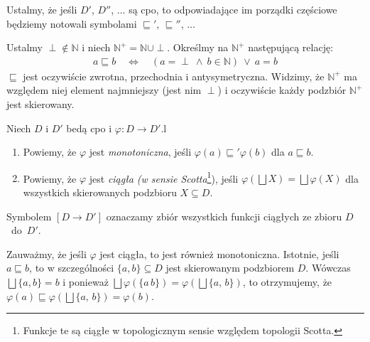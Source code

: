 Ustalmy, że jeśli \(D'\), \(D''\), \(\dots\)  są cpo, to odpowiadające im porządki częściowe będziemy notowali symbolami \(\sqsubseteq'\), \(\sqsubseteq''\), \(\dots\)

\begin{przyklad}\label{ex:scott_d0}
  Ustalmy \(\perp\not\in \mathbb{N}\) i niech \(\mathbb{N}^{+}=\mathbb{N}\cup{\perp}\). Określmy na \(\mathbb{N}^+\) następującą relację:
  \begin{align*}
    a \sqsubseteq b \quad \Leftrightarrow\quad (a=\perp\ \land\ b\in \mathbb{N})\ \lor\ a = b
  \end{align*}
  \(\sqsubseteq\) jest oczywiście zwrotna, przechodnia i antysymetryczna. Widzimy, że \(\mathbb{N}^{+}\) ma względem niej element najmniejszy (jest nim  \(\perp\)) i oczywiście każdy podzbiór \(\mathbb{N}^{+}\) jest skierowany. 
\end{przyklad}

\begin{definicja}\label{def:m_cont}%
Niech \(D\) i \(D'\) bedą cpo i \(\varphi: D\to D'\).l
\begin{enumerate}[label={(\alph*)}, ref={(\alph*)}] 
  \setlength\itemsep{0em}
\item Powiemy, że \(\varphi\) jest \emph{monotoniczna}, jeśli \(\varphi(a) \sqsubseteq' \varphi(b)\) dla \(a\sqsubseteq b\).
\item Powiemy, że \(\varphi\) jest \emph{ciągła (w sensie Scotta}\footnote{Funkcje te są ciągłe w topologicznym sensie względem topologii Scotta.}), jeśli \(\varphi(\bigsqcup X) = \bigsqcup \varphi (X)\) dla wszystkich skierowanych podzbioru \(X\subseteq D\).\label{def:m_cont_2}
\end{enumerate}
Symbolem \([D\to D']\) oznaczamy zbiór wszystkich funkcji ciągłych ze zbioru \(D\)~do~\(D'\).
\end{definicja}

\begin{uwaga*}
Zauważmy, że jeśli \(\varphi\) jest ciągła, to jest również monotoniczna. Istotnie, jeśli \(a\sqsubseteq b\), to w szczególności \(\{a, b\}\subseteq D\) jest skierowanym podzbiorem \(D\). Wówczas \(\bigsqcup\{a, b\}=b\) i ponieważ \(\bigsqcup \varphi(\{a\,b\})=\varphi(\bigsqcup\{a,\,b\})\), to otrzymujemy, że \(\varphi(a)\sqsubseteq \varphi(\bigsqcup\{a,\,b\}) = \varphi(b)\).
\end{uwaga*}

